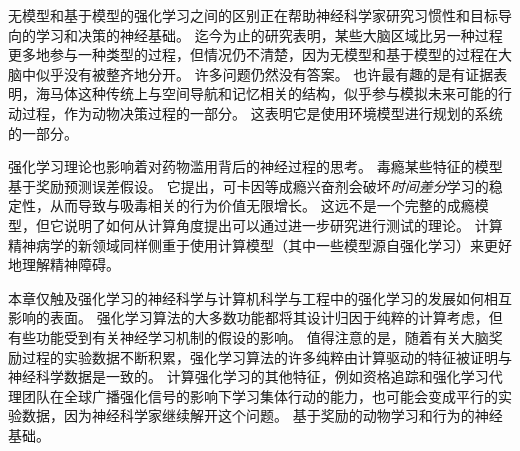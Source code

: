 无模型和基于模型的强化学习之间的区别正在帮助神经科学家研究习惯性和目标导向的学习和决策的神经基础。
迄今为止的研究表明，某些大脑区域比另一种过程更多地参与一种类型的过程，但情况仍不清楚，因为无模型和基于模型的过程在大脑中似乎没有被整齐地分开。
许多问题仍然没有答案。
也许最有趣的是有证据表明，海马体这种传统上与空间导航和记忆相关的结构，似乎参与模拟未来可能的行动过程，作为动物决策过程的一部分。
这表明它是使用环境模型进行规划的系统的一部分。


强化学习理论也影响着对药物滥用背后的神经过程的思考。
毒瘾某些特征的模型基于奖励预测误差假设。
它提出，可卡因等成瘾兴奋剂会破坏\textit{时间差分}学习的稳定性，从而导致与吸毒相关的行为价值无限增长。
这远不是一个完整的成瘾模型，但它说明了如何从计算角度提出可以通过进一步研究进行测试的理论。
计算精神病学的新领域同样侧重于使用计算模型（其中一些模型源自强化学习）来更好地理解精神障碍。



本章仅触及强化学习的神经科学与计算机科学与工程中的强化学习的发展如何相互影响的表面。
强化学习算法的大多数功能都将其设计归因于纯粹的计算考虑，但有些功能受到有关神经学习机制的假设的影响。
值得注意的是，随着有关大脑奖励过程的实验数据不断积累，强化学习算法的许多纯粹由计算驱动的特征被证明与神经科学数据是一致的。
计算强化学习的其他特征，例如资格追踪和强化学习代理团队在全球广播强化信号的影响下学习集体行动的能力，也可能会变成平行的实验数据，因为神经科学家继续解开这个问题。
基于奖励的动物学习和行为的神经基础。









